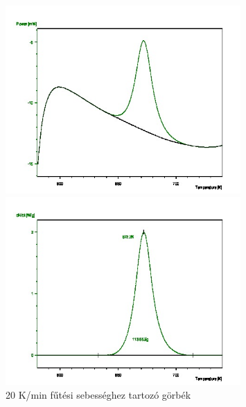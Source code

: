 \documentclass[a4paper,12pt]{article}
\begin{document}
\begin{figure}[H]
\centering
\begin{minipage}{0.49\textwidth}
\centering
\includegraphics[width=0.8\textwidth]{8outs.jpg}
\end{minipage}
\begin{minipage}{0.49\textwidth}
\centering
\includegraphics[width=0.8\textwidth]{9outs.jpg}
\end{minipage}
\caption{20 K/min fűtési sebességhez tartozó görbék}
\end{figure}
\end{document}
